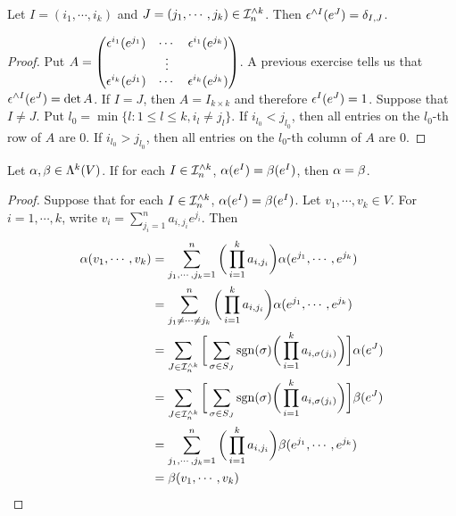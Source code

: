 \documentclass{book}
\begin{document}
	\begin{ex}
		Let $I = (i_1, \cdots, i_k)$ and $J = (j_1, \cdots, j_k) \in \mathcal{I}_n^{\wedge k}$. Then $\epsilon^{\wedge I} (e^J) = \delta_{I,J}$.
	\end{ex}

	\begin{proof}
		Put $A = \begin{pmatrix}
			\epsilon^{i_1}(e^{j_1}) & \cdots & \epsilon^{i_1}(e^{j_k}) \\
			& \vdots & \\
			\epsilon^{i_k}(e^{j_1}) & \cdots & \epsilon^{i_k}(e^{j_k}) 
		\end{pmatrix}$.
		A previous exercise tells us that $\epsilon^{\wedge I} (e^J) = \det A$.
		If $I = J$, then $A = I_{k\times k}$ and therefore $\epsilon^I(e^J) = 1$. Suppose that $I \neq J$. Put $l_0 = \min \{l: 1 \leq l \leq k, i_l \neq j_l\}$. If $i_{l_0} < j_{l_0}$, then all entries on the $l_0$-th row of $A$ are $0$. If $i_{l_0} > j_{l_0}$, then all entries on the $l_0$-th column of $A$ are $0$.
	\end{proof}

	\begin{ex}
		Let $\alpha , \beta \in \Lambda^k(V)$. If for each $I \in \mathcal{I}_n^{\wedge k}$, $\alpha(e^I) = \beta(e^I)$, then $\alpha = \beta$.
	\end{ex}

	\begin{proof}
		Suppose that for each $I \in \mathcal{I}_n^{\wedge k}$, $\alpha(e^I) = \beta(e^I)$. Let $v_1, \cdots, v_k \in V$. For $i = 1, \cdots, k$, write $v_i = \sum_{j_i = 1}^n a_{i,j_i}e^{j_i}$. Then 
		\begin{align*}
			\alpha(v_1, \cdots, v_k) 
			&= \sum_{j_1, \cdots, j_k =1}^n \bigg( \prod_{i=1}^k a_{i, j_i} \bigg) \alpha(e^{j_1}, \cdots, e^{j_k}) \\
			&= \sum_{j_1 \neq \cdots \neq j_k}^n \bigg( \prod_{i=1}^k a_{i, j_i} \bigg) \alpha(e^{j_1}, \cdots, e^{j_k}) \\
			&= \sum_{J \in \mathcal{I}_n^{\wedge k}} \bigg [ \sum_{\sigma \in S_J} \operatorname{sgn}(\sigma) \bigg( \prod_{i=1}^k a_{i, \sigma(j_i)} \bigg) \bigg] \alpha(e^J) \\
			&= \sum_{J \in \mathcal{I}_n^{\wedge k}} \bigg [ \sum_{\sigma \in S_J} \operatorname{sgn}(\sigma) \bigg( \prod_{i=1}^k a_{i, \sigma(j_i)} \bigg) \bigg] \beta(e^J) \\
			&= \sum_{j_1, \cdots, j_k =1}^n \bigg( \prod_{i=1}^k a_{i, j_i} \bigg) \beta(e^{j_1}, \cdots, e^{j_k}) \\
			&= \beta(v_1, \cdots, v_k) 
		\end{align*}
	
	\end{proof}
\end{document}
